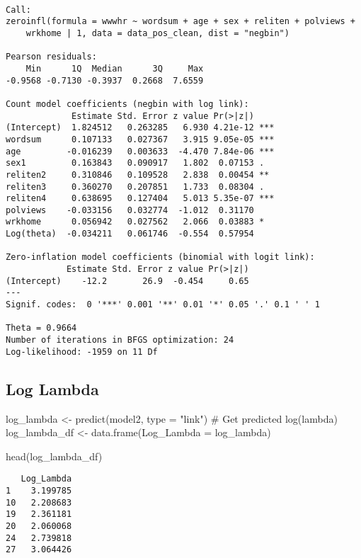 \documentclass[
  letterpaper,
  DIV=11,
  numbers=noendperiod]{scrartcl}
\newenvironment{Shaded}{\begin{snugshade}}{\end{snugshade}}
\newcommand{\AttributeTok}[1]{\textcolor[rgb]{0.40,0.45,0.13}{#1}}
\newcommand{\CommentTok}[1]{\textcolor[rgb]{0.37,0.37,0.37}{#1}}
\newcommand{\FunctionTok}[1]{\textcolor[rgb]{0.28,0.35,0.67}{#1}}
\newcommand{\NormalTok}[1]{\textcolor[rgb]{0.00,0.23,0.31}{#1}}
\newcommand{\OtherTok}[1]{\textcolor[rgb]{0.00,0.23,0.31}{#1}}
\newcommand{\StringTok}[1]{\textcolor[rgb]{0.13,0.47,0.30}{#1}}
\begin{document}
\begin{verbatim}

Call:
zeroinfl(formula = wwwhr ~ wordsum + age + sex + reliten + polviews + 
    wrkhome | 1, data = data_pos_clean, dist = "negbin")

Pearson residuals:
    Min      1Q  Median      3Q     Max 
-0.9568 -0.7130 -0.3937  0.2668  7.6559 

Count model coefficients (negbin with log link):
             Estimate Std. Error z value Pr(>|z|)    
(Intercept)  1.824512   0.263285   6.930 4.21e-12 ***
wordsum      0.107133   0.027367   3.915 9.05e-05 ***
age         -0.016239   0.003633  -4.470 7.84e-06 ***
sex1         0.163843   0.090917   1.802  0.07153 .  
reliten2     0.310846   0.109528   2.838  0.00454 ** 
reliten3     0.360270   0.207851   1.733  0.08304 .  
reliten4     0.638695   0.127404   5.013 5.35e-07 ***
polviews    -0.033156   0.032774  -1.012  0.31170    
wrkhome      0.056942   0.027562   2.066  0.03883 *  
Log(theta)  -0.034211   0.061746  -0.554  0.57954    

Zero-inflation model coefficients (binomial with logit link):
            Estimate Std. Error z value Pr(>|z|)
(Intercept)    -12.2       26.9  -0.454     0.65
---
Signif. codes:  0 '***' 0.001 '**' 0.01 '*' 0.05 '.' 0.1 ' ' 1 

Theta = 0.9664 
Number of iterations in BFGS optimization: 24 
Log-likelihood: -1959 on 11 Df
\end{verbatim}

\subsection{Log Lambda}

\begin{Shaded}
\begin{Highlighting}[]
\NormalTok{log\_lambda }\OtherTok{\textless{}{-}} \FunctionTok{predict}\NormalTok{(model2, }\AttributeTok{type =} \StringTok{"link"}\NormalTok{)  }\CommentTok{\# Get predicted log(lambda)}
\NormalTok{log\_lambda\_df }\OtherTok{\textless{}{-}} \FunctionTok{data.frame}\NormalTok{(}\AttributeTok{Log\_Lambda =}\NormalTok{ log\_lambda)}

\FunctionTok{head}\NormalTok{(log\_lambda\_df)}
\end{Highlighting}
\end{Shaded}

\begin{verbatim}
   Log_Lambda
1    3.199785
10   2.208683
19   2.361181
20   2.060068
24   2.739818
27   3.064426
\end{verbatim}
\end{document}
